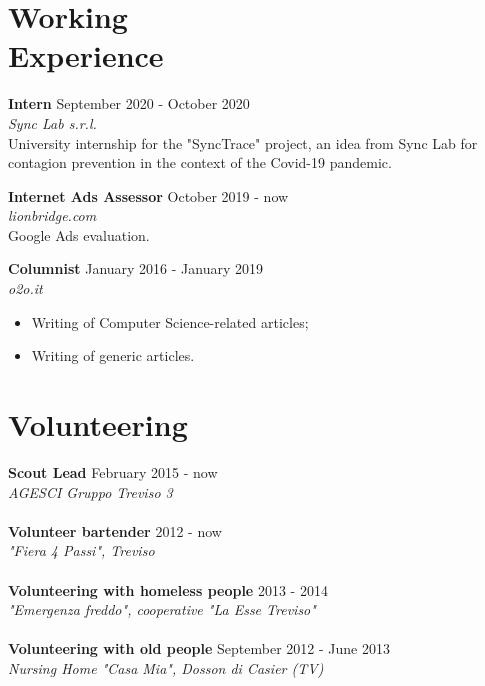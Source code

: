 \documentclass[margin, 10pt]{res}
\begin{document}
\begin{resume}
 
\section{Working \\ Experience}

\textbf{Intern} \hfill September 2020 - October 2020 \\
\textit{Sync Lab s.r.l.} \\
University internship for the "SyncTrace" project, an idea from Sync Lab for contagion prevention in the context of the Covid-19 pandemic.

\textbf{Internet Ads Assessor} \hfill October 2019 - now \\
\textit{lionbridge.com} \\
Google Ads evaluation.

\textbf{Columnist} \hfill January 2016 - January 2019 \\
\textit{o2o.it}
\begin{itemize}
\item Writing of Computer Science-related articles;
\item Writing of generic articles.
\end{itemize} 



\section{Volunteering}

\textbf{Scout Lead} \hfill February 2015 - now \\
\textit{AGESCI Gruppo Treviso 3} \\ \\
\textbf{Volunteer bartender} \hfill 2012 - now \\
\textit{"Fiera 4 Passi", Treviso} \\ \\
\textbf{Volunteering with homeless people} \hfill 2013 - 2014 \\
\textit{"Emergenza freddo", cooperative "La Esse Treviso"} \\ \\
\textbf{Volunteering with old people} \hfill September 2012 - June 2013 \\
\textit{Nursing Home "Casa Mia", Dosson di Casier (TV)} 



\end{resume}
\end{document}
